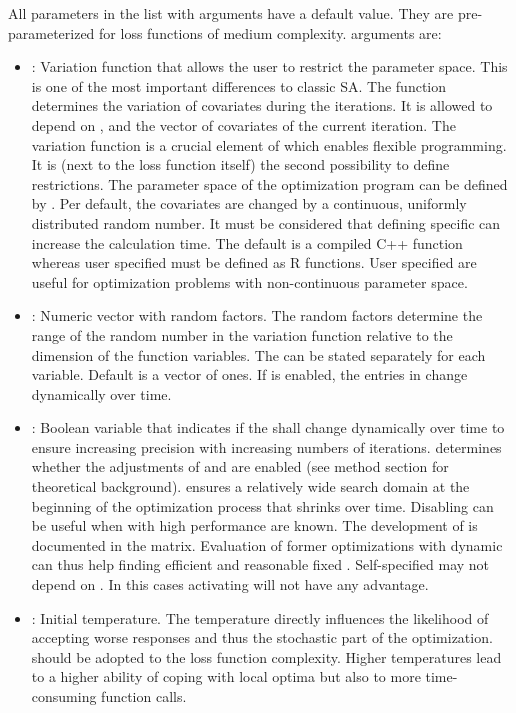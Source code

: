 All parameters in the list with  arguments have a default value. They are pre-parameterized for loss functions of medium complexity.  arguments are:
\begin{itemize}
\item {}: Variation function that allows the user to restrict the parameter space.  This is one of the most important differences to classic SA. The function determines the variation of covariates during the iterations. It is allowed to depend on ,  and the vector of covariates of the current iteration. The variation function is a crucial element of  which enables flexible programming. It is (next to the loss function itself) the second possibility to define restrictions. The parameter space of the optimization program can be defined by . Per default, the covariates are changed by a continuous, uniformly distributed random number. It must be considered that defining specific  can increase the calculation time. The default  is a compiled C++ function whereas user specified  must be defined as R functions. User specified  are useful for optimization problems with non-continuous parameter space.
\item {}: Numeric vector with random factors. The random factors determine the range of the random number in the variation function  relative to the dimension of the function variables. The  can be stated separately for each variable. Default is a vector of ones. If  is enabled, the entries in  change dynamically over time.
\item {}: Boolean variable that indicates if the  shall change dynamically over time to ensure increasing precision with increasing numbers of iterations.  determines whether the adjustments of \citet{corana_1987} and \citet{pronzato_1984} are enabled (see method section for theoretical background).  ensures a relatively wide search domain at the beginning of the optimization process that shrinks over time. Disabling  can be useful when  with high performance are known. The development of  is documented in the  matrix. Evaluation of former optimizations with dynamic  can thus help finding efficient and reasonable fixed . Self-specified  may not depend on . In this cases activating  will not have any advantage.
\item {}: Initial temperature. The temperature directly influences the likelihood of accepting worse responses and thus the stochastic part of the optimization.  should be adopted to the loss function complexity. Higher temperatures lead to a higher ability of coping with local optima but also to more time-consuming function calls.

\end{itemize}
